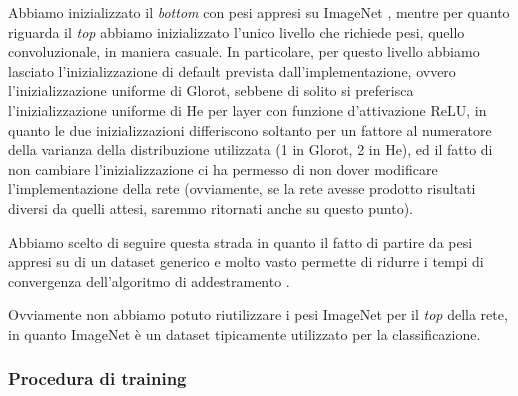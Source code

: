 Abbiamo inizializzato il \emph{bottom} con pesi appresi su ImageNet \cite{imagenet}, mentre per quanto riguarda il \emph{top} abbiamo inizializzato l'unico livello che richiede pesi, quello convoluzionale, in maniera casuale. In particolare, per questo livello abbiamo lasciato l'inizializzazione di default prevista dall'implementazione, ovvero l'inizializzazione uniforme di Glorot, sebbene di solito si preferisca l'inizializzazione uniforme di He per layer con funzione d'attivazione ReLU, in quanto le due inizializzazioni differiscono soltanto per un fattore al numeratore della varianza della distribuzione utilizzata (1 in Glorot, 2 in He), ed il fatto di non cambiare l'inizializzazione ci ha permesso di non dover modificare l'implementazione della rete (ovviamente, se la rete avesse prodotto risultati diversi da quelli attesi, saremmo ritornati anche su questo punto).

Abbiamo scelto di seguire questa strada in quanto il fatto di partire da pesi appresi su di un dataset generico e molto vasto permette di ridurre i tempi di convergenza dell'algoritmo di addestramento \cite{miviaage}. 

Ovviamente non abbiamo potuto riutilizzare i pesi ImageNet per il \emph{top} della rete, in quanto ImageNet è un dataset tipicamente utilizzato per la classificazione.

\subsubsection{Procedura di training}

